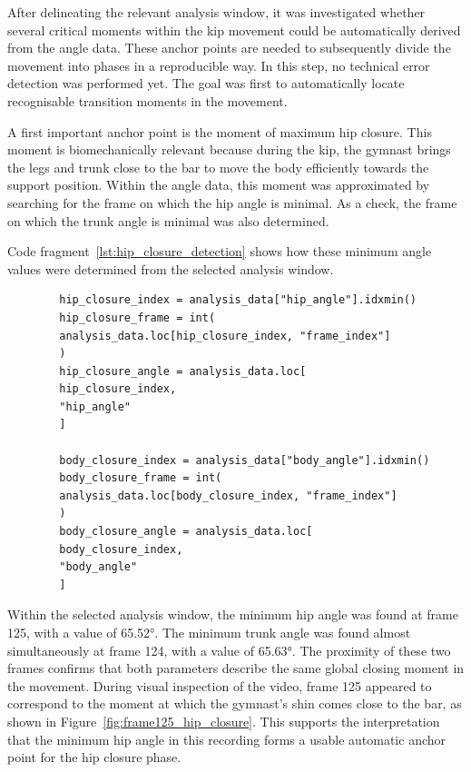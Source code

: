 After delineating the relevant analysis window, it was investigated whether several critical moments within the kip movement could be automatically derived from the angle data. These anchor points are needed to subsequently divide the movement into phases in a reproducible way. In this step, no technical error detection was performed yet. The goal was first to automatically locate recognisable transition moments in the movement.

A first important anchor point is the moment of maximum hip closure. This moment is biomechanically relevant because during the kip, the gymnast brings the legs and trunk close to the bar to move the body efficiently towards the support position. Within the angle data, this moment was approximated by searching for the frame on which the hip angle is minimal. As a check, the frame on which the trunk angle is minimal was also determined.

Code fragment~\ref{lst:hip_closure_detection} shows how these minimum angle values were determined from the selected analysis window.

\begin{listing}[H]
    \begin{verbatim}
        hip_closure_index = analysis_data["hip_angle"].idxmin()
        hip_closure_frame = int(
        analysis_data.loc[hip_closure_index, "frame_index"]
        )
        hip_closure_angle = analysis_data.loc[
        hip_closure_index,
        "hip_angle"
        ]
        
        body_closure_index = analysis_data["body_angle"].idxmin()
        body_closure_frame = int(
        analysis_data.loc[body_closure_index, "frame_index"]
        )
        body_closure_angle = analysis_data.loc[
        body_closure_index,
        "body_angle"
        ]
    \end{verbatim}
    \caption{Automatic detection of the moment of maximum hip and trunk closure from \href{https://github.com/Tristanvanspeybroeck/bachelorproef-Methodologie-25-26-Van-Speybroeck-Tristan/blob/main/Methodologie/pose_project/src/analyze_kip_execution.py}{\texttt{analyze\_kip\_execution.py}}}
    \label{lst:hip_closure_detection}
\end{listing}

Within the selected analysis window, the minimum hip angle was found at frame 125, with a value of 65.52°. The minimum trunk angle was found almost simultaneously at frame 124, with a value of 65.63°. The proximity of these two frames confirms that both parameters describe the same global closing moment in the movement. During visual inspection of the video, frame 125 appeared to correspond to the moment at which the gymnast's shin comes close to the bar, as shown in Figure~\ref{fig:frame125_hip_closure}. This supports the interpretation that the minimum hip angle in this recording forms a usable automatic anchor point for the hip closure phase.

